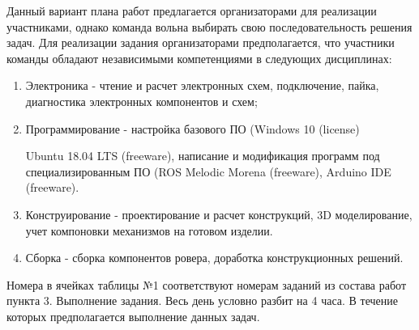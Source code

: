 Данный вариант плана работ предлагается организаторами для реализации участниками, однако команда вольна выбирать свою последовательность решения задач. Для реализации задания организаторами предполагается, что участники команды обладают независимыми компетенциями в следующих дисциплинах:
\begin{enumerate}
    \item Электроника - чтение и расчет электронных схем, подключение, пайка, диагностика электронных компонентов и схем; 
    \item Программирование - настройка базового ПО (Windows 10 (license)
    
    Ubuntu 18.04 LTS (freeware), написание и модификация программ под специализированным ПО (ROS Melodic Morena (freeware), Arduino IDE (freeware).
    \item Конструирование - проектирование и расчет конструкций, 3D моделирование, учет компоновки механизмов на готовом изделии.
    \item Сборка - сборка компонентов ровера, доработка конструкционных решений.
\end{enumerate}
Номера в ячейках таблицы №1 соответствуют номерам заданий из состава работ пункта 3. Выполнение задания. Весь день условно разбит на 4 часа. В течение которых предполагается выполнение данных задач.

